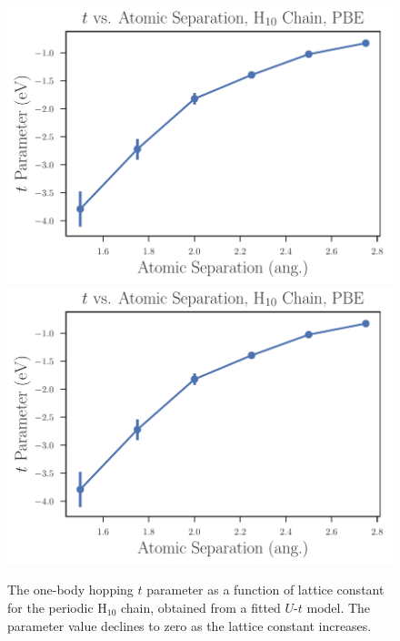 \begin{figure}
\centering
\includegraphics[scale=0.5]{./Figures/$t$_vs_separation_h_chain_ols.pdf}
\includegraphics[scale=0.5]{./Figures/$t$_vs_separation_h_chain_ols.pdf}
\caption{ The one-body hopping $t$ parameter as a function of lattice constant for the periodic H$_{10}$ chain, obtained from a fitted $U$-$t$ model. The parameter value declines to zero as the lattice constant increases. }\label{fig:Parameters-vs-Bond-t}
\end{figure}
